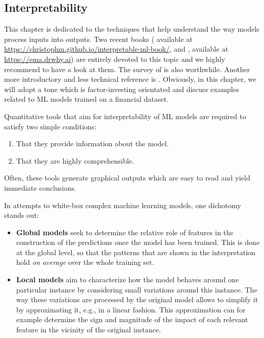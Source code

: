 \subsection{Interpretability}

This chapter is dedicated to the techniques that help understand the way models process inputs into outputs. Two recent books (\cite{molnar2019interpretable} available at \href{https://christophm.github.io/interpretable-ml-book/}{https://christophm.github.io/interpretable-ml-book/}, and \cite{biecek2021explanatory}, available at \href{https://ema.drwhy.ai}{https://ema.drwhy.ai}) are entirely devoted to this topic and we highly recommend to have a look at them. The survey of \cite{belle2020principles} is also worthwhile. Another more introductory and less technical reference is \cite{hall2019introduction}.
Obviously, in this chapter, we will adopt a tone which is factor-investing orientated and discuss examples related to ML models trained on a financial dataset.

Quantitative tools that aim for interpretability of ML models are required to satisfy two simple conditions:

\begin{enumerate}
\item That they provide information about the model.
\item That they are highly comprehensible.
\end{enumerate}

Often, these tools generate graphical outputs which are easy to read and yield immediate conclusions.

In attempts to white-box complex machine learning models, one dichotomy stands out:

\begin{itemize}
\item \textbf{Global models} seek to determine the relative role of features in the construction of the predictions once the model has been trained. This is done at the global level, so that the patterns that are shown in the interpretation hold \textit{on average} over the whole training set.
\item \textbf{Local models} aim to characterize how the model behaves around one particular instance by considering small variations around this instance. The way these variations are processed by the original model allows to simplify it by approximating it, e.g., in a linear fashion. This approximation can for example determine the sign and magnitude of the impact of each relevant feature in the vicinity of the original instance.
\end{itemize}

